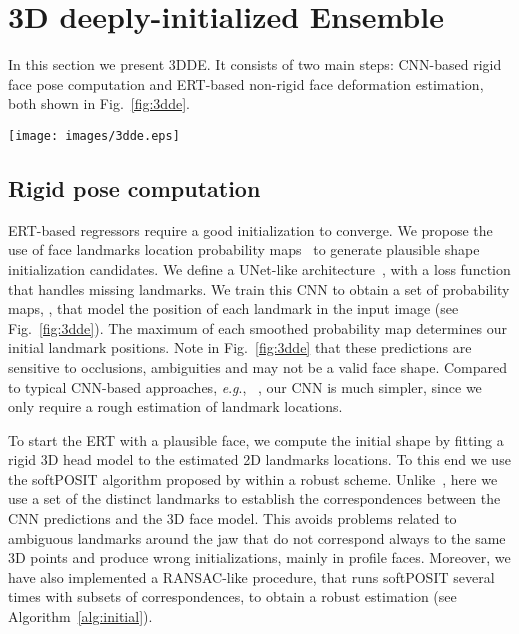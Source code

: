\documentclass[11pt,twocolumn]{article}
\newcommand{\eg}{\textit{e}.\textit{g}., }
\begin{document}
\section{3D deeply-initialized Ensemble}\label{sec:algorithm}
In this section we present 3DDE. It consists of two main steps: CNN-based rigid face pose computation and ERT-based non-rigid face deformation estimation, both shown in Fig.~\ref{fig:3dde}.
\begin{figure*}
\centering
\texttt{[image: images/3dde.eps]}
\caption{3DDE framework diagram. GS, Max and RANSAC+POSIT represent the Gaussian smoothing filter, the maximum of each probability map and the robust 3D pose estimation respectively.}
\label{fig:3dde}
\end{figure*}

\subsection{Rigid pose computation}
\label{sec:rigid}

ERT-based regressors require a good initialization to converge. We propose the use of face landmarks location probability maps~\citep{Belhumeur11,Dantone12,Xiao16} to generate plausible shape initialization candidates. We define a UNet-like architecture~\citep{Ronneberger15,Honari16}, with a loss function that handles missing landmarks. We train this CNN to obtain a set of probability maps, , that model the position of each landmark in the input image (see Fig.~\ref{fig:3dde}). The maximum of each smoothed probability map determines our initial landmark positions. Note in Fig.~\ref{fig:3dde} that these predictions are sensitive to occlusions, ambiguities and may not be a valid face shape. Compared to typical CNN-based approaches, \eg~\cite{Yang17}, our CNN is much simpler, since we only require a rough estimation of landmark locations.

To start the ERT with a plausible face, we compute the initial shape by fitting a rigid 3D head model to the estimated 2D landmarks locations. To this end we use the softPOSIT algorithm proposed by \cite{David04} within a robust scheme. Unlike~\cite{Valle18}, here we use a set of the distinct landmarks to establish the correspondences between the CNN predictions and the 3D face model. This avoids problems related to ambiguous landmarks around the jaw that do not correspond always to the same 3D points and produce wrong initializations, mainly in profile faces. Moreover, we have also implemented a RANSAC-like procedure, that runs softPOSIT several times with subsets of correspondences, to obtain a robust estimation (see Algorithm~\ref{alg:initial}). 
\end{document}
